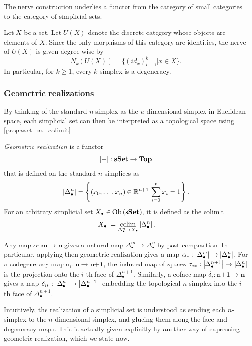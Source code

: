 The nerve construction underlies a functor from the category of small categories to the category of simplicial sets.

\begin{example}
    Let $X$ be a set. Let $U(X)$ denote the discrete category whose objects are elements of $X$. Since the only morphisms of this category are identities, the nerve of $U(X)$ is given degree-wise by
    \[ N_{k}(U(X)) = \{(id_{x})_{i = 1}^{k} | x \in X \}.\]
    In particular, for $k \geq 1$, every $k$-simplex is a degeneracy.
\end{example}


\subsubsection{Geometric realizations}

By thinking of the standard $n$-simplex as the $n$-dimensional simplex in Euclidean space, each simplicial set can then be interpreted as a topological space using \cref{prop:sset_as_colimit}

\begin{definition}
    \emph{Geometric realization} is a functor
    \[ \left| - \right| : \textbf{sSet} \to \textbf{Top} \]
    that is defined on the standard $n$-simplices as
    \[ \left| \Delta^n_{\bullet} \right| = \left\{\left(x_0, \ldots, x_n\right) \in \mathbb{R}^{n+1} \middle| \sum_{i = 0}^{n} x_i = 1 \right\}. \]
    For an arbitrary simplicial set $X_\bullet \in \operatorname{Ob}{\lparen \textbf{sSet} \rparen}$, it is defined as the colimit
    \[ \left| X_{\bullet} \right| = \mathop{\mathrm{colim}}\limits_{\Delta^n_{\bullet} \to X_\bullet} \left| \Delta^{n}_{\bullet} \right|. \]
\end{definition}

Any map $\alpha : \textbf{m} \to \textbf{n}$ gives a natural map $\Delta^m_{\bullet} \to \Delta^n_{\bullet}$ by post-composition. In particular, applying then geometric realization gives a map $\alpha_* : \left| \Delta^m_{\bullet} \right| \to \left| \Delta^n_{\bullet} \right|$. For a codegeneracy map $\sigma_i : \textbf{n} \to \textbf{n+1}$, the induced map of spaces $\sigma_{i*} : \left| \Delta^{n+1}_{\bullet} \right| \to \left| \Delta^n_{\bullet} \right|$ is the projection onto the $i$-th face of $\Delta^{n+1}_{\bullet}$. Similarly, a coface map $\delta_i : \textbf{n+1} \to \textbf{n}$ gives a map $\delta_{i*} : \left| \Delta^n_{\bullet} \right| \to \left| \Delta^{n+1}_{\bullet} \right|$ embedding the topological $n$-simplex into the $i$-th face of $\Delta^{n+1}_{\bullet}$.

Intuitively, the realization of a simplicial set is understood as sending each $n$-simplex to the $n$-dimensional simplex, and glueing them along the face and degeneracy maps. This is actually given explicitly by another way of expressing geometric realization, which we state now.


